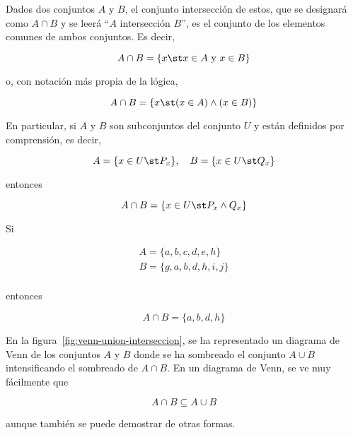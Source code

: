 

Dados dos conjuntos $A$ y $B$, el conjunto intersección de estos, que se
designará como $A \cap B$ y se leerá ``$A$ intersección $B$'', es el
conjunto de los elementos comunes de ambos conjuntos. Es decir,

\[ A \cap B = \{x \st x \in A \ \text{y} \ x \in B\} \]

\noindent o, con notación más propia de la lógica,

\[ A \cap B = \{x \st (x \in A) \land (x \in B)\} \]

En particular, si $A$ y $B$ son subconjuntos del conjunto $U$ y están
definidos por comprensión, es decir,

\[ A = \{x \in U \st P_x\}, \quad B = \{x \in U \st Q_x\} \]

\noindent entonces

\[ A \cap B = \{x \in U \st P_x \land Q_x\} \]

\begin{example}
  Si

  \begin{align*}
    A = \{a, b, c, d, e, h\} \\
    B = \{g, a, b, d, h, i, j\} \\
  \end{align*}

  \noindent entonces

  \[ A \cap B = \{a, b, d, h\} \]
\end{example}

En la figura~\ref{fig:venn-union-interseccion}, se ha representado un
diagrama de Venn de los conjuntos $A$ y $B$ donde se ha sombreado el
conjunto $A \cup B$ intensificando el sombreado de $A \cap B$. En un
diagrama de Venn, se ve muy fácilmente que

\[ A \cap B \subseteq A \cup B \]

\noindent aunque también se puede demostrar de otras formas.


